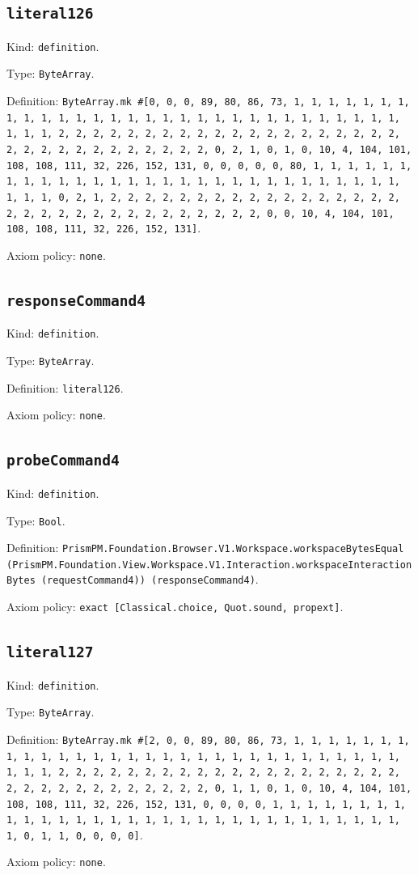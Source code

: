 \documentclass[11pt]{article}
\begin{document}
\subsection*{\texttt{literal126}}
\noindent Kind: \texttt{definition}.\par
\noindent Type: \texttt{ByteArray}.\par
\noindent Definition: \texttt{ByteArray.mk \#[0, 0, 0, 89, 80, 86, 73, 1, 1, 1, 1, 1, 1, 1, 1, 1, 1, 1, 1, 1, 1, 1, 1, 1, 1, 1, 1, 1, 1, 1, 1, 1, 1, 1, 1, 1, 1, 1, 1, 1, 2, 2, 2, 2, 2, 2, 2, 2, 2, 2, 2, 2, 2, 2, 2, 2, 2, 2, 2, 2, 2, 2, 2, 2, 2, 2, 2, 2, 2, 2, 2, 2, 0, 2, 1, 0, 1, 0, 10, 4, 104, 101, 108, 108, 111, 32, 226, 152, 131, 0, 0, 0, 0, 0, 80, 1, 1, 1, 1, 1, 1, 1, 1, 1, 1, 1, 1, 1, 1, 1, 1, 1, 1, 1, 1, 1, 1, 1, 1, 1, 1, 1, 1, 1, 1, 1, 1, 0, 2, 1, 2, 2, 2, 2, 2, 2, 2, 2, 2, 2, 2, 2, 2, 2, 2, 2, 2, 2, 2, 2, 2, 2, 2, 2, 2, 2, 2, 2, 2, 2, 2, 2, 0, 0, 10, 4, 104, 101, 108, 108, 111, 32, 226, 152, 131]}.\par
\noindent Axiom policy: \texttt{none}.\par
\subsection*{\texttt{responseCommand4}}
\noindent Kind: \texttt{definition}.\par
\noindent Type: \texttt{ByteArray}.\par
\noindent Definition: \texttt{literal126}.\par
\noindent Axiom policy: \texttt{none}.\par
\subsection*{\texttt{probeCommand4}}
\noindent Kind: \texttt{definition}.\par
\noindent Type: \texttt{Bool}.\par
\noindent Definition: \texttt{PrismPM.Foundation.Browser.V1.Workspace.workspaceBytesEqual (PrismPM.Foundation.View.Workspace.V1.Interaction.workspaceInteractionBytes (requestCommand4)) (responseCommand4)}.\par
\noindent Axiom policy: \texttt{exact [Classical.choice, Quot.sound, propext]}.\par
\subsection*{\texttt{literal127}}
\noindent Kind: \texttt{definition}.\par
\noindent Type: \texttt{ByteArray}.\par
\noindent Definition: \texttt{ByteArray.mk \#[2, 0, 0, 89, 80, 86, 73, 1, 1, 1, 1, 1, 1, 1, 1, 1, 1, 1, 1, 1, 1, 1, 1, 1, 1, 1, 1, 1, 1, 1, 1, 1, 1, 1, 1, 1, 1, 1, 1, 1, 2, 2, 2, 2, 2, 2, 2, 2, 2, 2, 2, 2, 2, 2, 2, 2, 2, 2, 2, 2, 2, 2, 2, 2, 2, 2, 2, 2, 2, 2, 2, 2, 0, 1, 1, 0, 1, 0, 10, 4, 104, 101, 108, 108, 111, 32, 226, 152, 131, 0, 0, 0, 0, 1, 1, 1, 1, 1, 1, 1, 1, 1, 1, 1, 1, 1, 1, 1, 1, 1, 1, 1, 1, 1, 1, 1, 1, 1, 1, 1, 1, 1, 1, 1, 1, 0, 1, 1, 0, 0, 0, 0]}.\par
\noindent Axiom policy: \texttt{none}.\par
\end{document}
